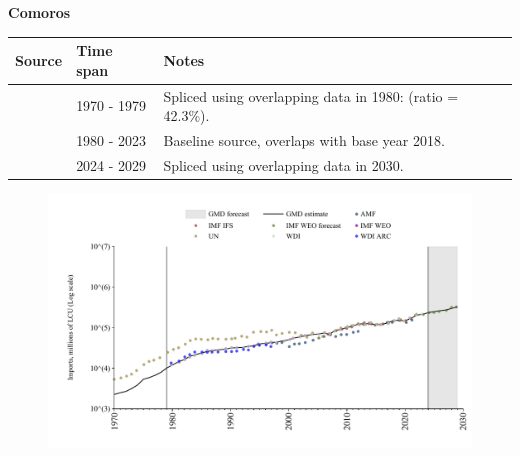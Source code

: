 \documentclass[12pt,a4paper,landscape]{article}
\begin{document}
\begin{adjustbox}{max totalsize={\paperwidth}{\paperheight},center}
\begin{minipage}[t][\textheight][t]{\textwidth}
\vspace*{0.5cm}
{}
\begin{center}
{\Large\bfseries Comoros}
\end{center}
\vspace{0.5cm}
\begin{table}[H]
\centering
\small
\begin{tabular}{|l|l|l|}
\hline
\textbf{Source} & \textbf{Time span} & \textbf{Notes} \\
\hline
\rowcolor{white}\cite{UN}& 1970 - 1979 &Spliced using overlapping data in 1980: (ratio = 42.3\%).\\
\rowcolor{lightgray}\cite{WDI}& 1980 - 2023 &Baseline source, overlaps with base year 2018.\\
\rowcolor{white}\cite{IMF_WEO_forecast}& 2024 - 2029 &Spliced using overlapping data in 2030.\\
\hline
\end{tabular}
\end{table}
\begin{figure}[H]
\centering
\includegraphics[width=\textwidth,height=0.6\textheight,keepaspectratio]{graphs/COM_imports.pdf}
\end{figure}
\end{minipage}
\end{adjustbox}
\end{document}
